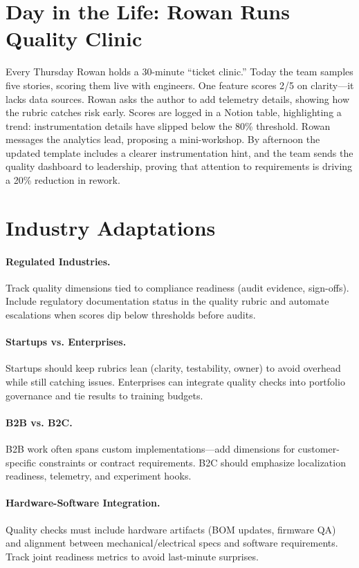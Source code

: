 \section{Day in the Life: Rowan Runs Quality Clinic}
Every Thursday Rowan holds a 30-minute ``ticket clinic.'' Today the team samples five stories, scoring them live with engineers. One feature scores 2/5 on clarity—it lacks data sources. Rowan asks the author to add telemetry details, showing how the rubric catches risk early. Scores are logged in a Notion table, highlighting a trend: instrumentation details have slipped below the 80\% threshold. Rowan messages the analytics lead, proposing a mini-workshop. By afternoon the updated template includes a clearer instrumentation hint, and the team sends the quality dashboard to leadership, proving that attention to requirements is driving a 20\% reduction in rework.
\section{Industry Adaptations}
\label{sec:quality-industry}
\paragraph{Regulated Industries.} Track quality dimensions tied to compliance readiness (audit evidence, sign-offs). Include regulatory documentation status in the quality rubric and automate escalations when scores dip below thresholds before audits.

\paragraph{Startups vs. Enterprises.} Startups should keep rubrics lean (clarity, testability, owner) to avoid overhead while still catching issues. Enterprises can integrate quality checks into portfolio governance and tie results to training budgets.

\paragraph{B2B vs. B2C.} B2B work often spans custom implementations—add dimensions for customer-specific constraints or contract requirements. B2C should emphasize localization readiness, telemetry, and experiment hooks.

\paragraph{Hardware-Software Integration.} Quality checks must include hardware artifacts (BOM updates, firmware QA) and alignment between mechanical/electrical specs and software requirements. Track joint readiness metrics to avoid last-minute surprises.
